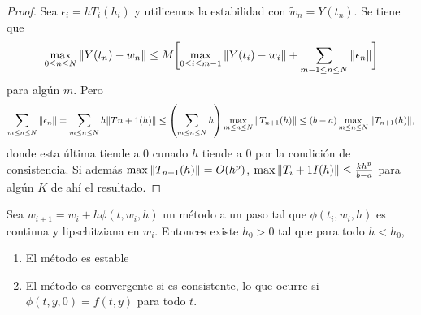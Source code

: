\begin{proof}
    Sea $\epsilon_i = hT_i(h_i)$ y utilicemos la estabilidad
    con $\tilde{w}_n = Y(t_n)$. Se tiene que
    \begin{equation*}
        \max_{0 \leq n \leq N}\norm{Y(t_n) - w_n} \leq M\qty\bigg[
            \max_{0 \leq i \leq m-1}\norm{Y(t_i) - w_i}
            + \sum_{m-1\leq n \leq N}\norm{\epsilon_n}
        ]
    \end{equation*}
    para algún $m$. Pero
    \begin{equation*}
        \sum_{m \leq n \leq N} \norm{\epsilon_n} =
        \sum_{m \leq n \leq N} h\norm{Tn+1(h)} \leq
        \qty(\sum_{m \leq n \leq N} h)
            \max_{m \leq n \leq N}\norm{T_{n+1}(h)} \leq
        (b-a)\max_{m \leq n \leq N}\norm{T_{n+1}(h)},
    \end{equation*}
    donde esta última tiende a $0$ cunado $h$ tiende a $0$
    por la condición de consistencia.
    Si además $\max\norm{T_{n+1}(h)} = O(h^p)$,
    $\max\norm{T_i+1I(h)} \leq \frac{kh^p}{b-a}$ para algún $K$
    de ahí el resultado.
\end{proof}

\begin{theorem}
    Sea $w_{i+1} = w_i + h\phi(t, w_i, h)$ un método a un paso tal que
    $\phi(t_i, w_i, h)$ es continua y lipschitziana en $w_i$.
    Entonces existe $h_0 > 0$ tal que para todo $h < h_0$,
    \begin{enumerate}
        \item El método es estable
        \item El método es convergente si es consistente,
        lo que ocurre si $\phi(t, y, 0) = f(t, y)$ para todo $t$.
    \end{enumerate}
\end{theorem}

